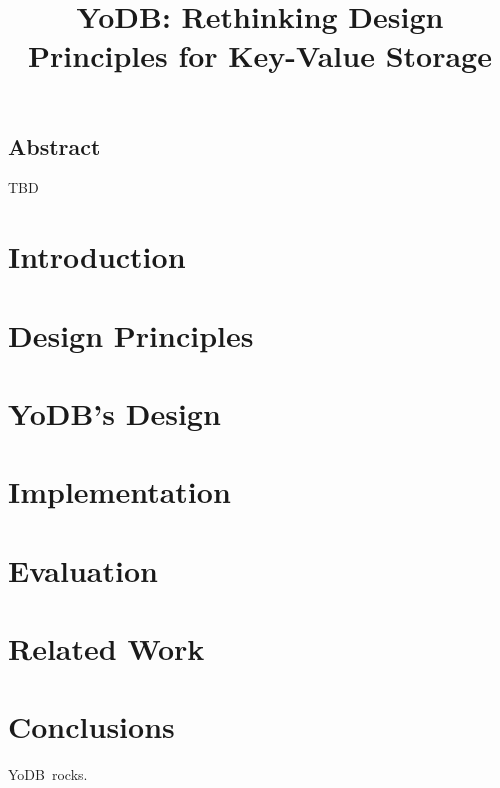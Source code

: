 \documentclass[letterpaper,twocolumn,10pt]{article}
\date{}
\newcommand{\sys}{YoDB}
\begin{document}
\title{\Large \bf \sys: Rethinking Design Principles for Key-Value Storage} 
\author{}
\maketitle

\subsection*{Abstract}

TBD

\section{Introduction}


\section{Design Principles}
\label{sec:principles}


\section{\sys's Design}
\label{sec:design}


\section{Implementation}
\label{sec:impl}


\section{Evaluation}
\label{sec:eval}


\section{Related Work}
\label{sec:related}


\section{Conclusions}
\label{sec:conclusions}
\sys\ rocks.

%

{\normalsize 
}

\end{document}
